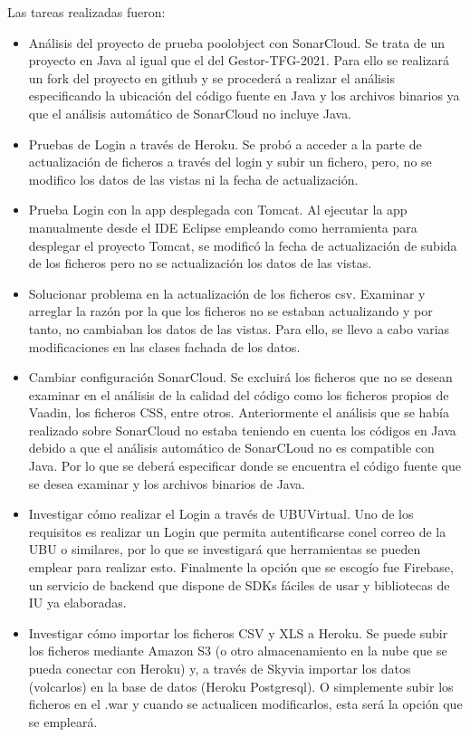 Las tareas realizadas fueron:
\begin{itemize}
	\tightlist
	\item Análisis del proyecto de prueba poolobject con SonarCloud.
	Se trata de un proyecto en Java al igual que el del Gestor-TFG-2021. Para ello se realizará un fork del proyecto en github y se procederá a realizar el análisis especificando la ubicación del código fuente en Java y los archivos binarios ya que el análisis automático de SonarCloud no incluye Java.
	\item Pruebas de Login a través de Heroku. 
	Se probó a acceder a la parte de actualización de ficheros a través del login y subir un fichero, pero, no se modifico los datos de las vistas ni la fecha de actualización.
	\item Prueba Login con la app desplegada con Tomcat. 
	Al ejecutar la app manualmente desde el IDE Eclipse empleando como herramienta para desplegar el proyecto Tomcat, se modificó la fecha de actualización de subida de los ficheros pero no se actualización los datos de las vistas.
	\item Solucionar problema en la actualización de los ficheros csv.
	 Examinar y arreglar la razón por la que los ficheros no se estaban actualizando y por tanto, no cambiaban los datos de las vistas. Para ello, se llevo a cabo varias modificaciones en las clases fachada de los datos.
	\item Cambiar configuración SonarCloud. 
	Se excluirá los ficheros que no se desean examinar en el análisis de la calidad del código como los ficheros propios de Vaadin, los ficheros CSS, entre otros. Anteriormente el análisis que se había realizado sobre SonarCloud no estaba teniendo en cuenta los códigos en Java debido a que el análisis automático de SonarCLoud no es compatible con Java. Por lo que se deberá especificar donde se encuentra el código fuente que se desea examinar y los archivos binarios de Java.
	\item Investigar cómo realizar el Login a través de UBUVirtual. 
	Uno de los requisitos es realizar un Login que permita autentificarse conel correo de la UBU o similares, por lo que se investigará que herramientas se pueden emplear para realizar esto. Finalmente la opción que se escogío fue Firebase, un servicio de backend que dispone de SDKs fáciles de usar y bibliotecas de IU ya elaboradas.
	\item Investigar cómo importar los ficheros CSV y XLS a Heroku.
	Se puede subir los ficheros mediante Amazon S3 (o otro almacenamiento en la nube que se pueda conectar con Heroku) y, a través de Skyvia importar los datos (volcarlos) en la base de datos (Heroku Postgresql). O simplemente subir los ficheros en el .war y cuando se actualicen modificarlos, esta será la opción que se empleará.

\end{itemize}

